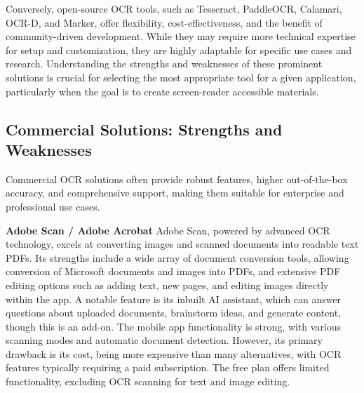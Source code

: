 Conversely, open-source OCR tools, such as Tesseract, PaddleOCR, Calamari, OCR-D, and Marker, offer flexibility, cost-effectiveness, and the benefit of community-driven development. While they may require more technical expertise for setup and customization, they are highly adaptable for specific use cases and research.\cite{Tesseract}\cite{PaddleOCR}\cite{Calamari}\cite{OCRD}\cite{Marker} Understanding the strengths and weaknesses of these prominent solutions is crucial for selecting the most appropriate tool for a given application, particularly when the goal is to create screen-reader accessible materials.

\subsection{Commercial Solutions: Strengths and Weaknesses}

Commercial OCR solutions often provide robust features, higher out-of-the-box accuracy, and comprehensive support, making them suitable for enterprise and professional use cases.

\textbf{Adobe Scan / Adobe Acrobat}
Adobe Scan, powered by advanced OCR technology, excels at converting images and scanned documents into readable text PDFs. Its strengths include a wide array of document conversion tools, allowing conversion of Microsoft documents and images into PDFs, and extensive PDF editing options such as adding text, new pages, and editing images directly within the app. A notable feature is its inbuilt AI assistant, which can answer questions about uploaded documents, brainstorm ideas, and generate content, though this is an add-on. The mobile app functionality is strong, with various scanning modes and automatic document detection. However, its primary drawback is its cost, being more expensive than many alternatives, with OCR features typically requiring a paid subscription. The free plan offers limited functionality, excluding OCR scanning for text and image editing.

